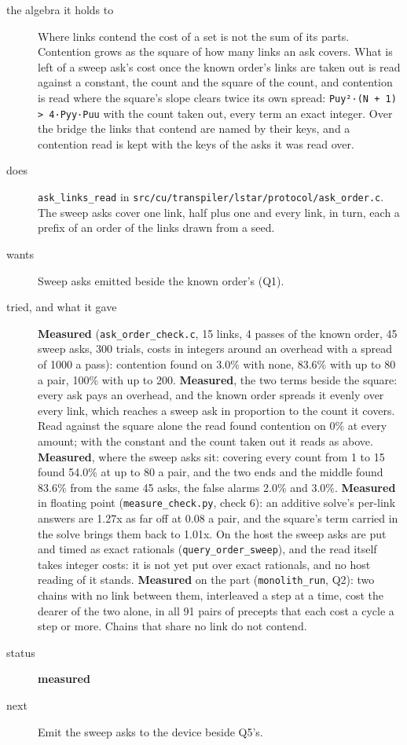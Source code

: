 \begin{description}
\item[{the algebra it holds to}] Where links contend the cost of a set is not the sum of its parts. Contention grows as the square of how many links an ask covers. What is left of a sweep ask's cost once the known order's links are taken out is read against a constant, the count and the square of the count, and contention is read where the square's slope clears twice its own spread: \texttt{Puy²·(N + 1) > 4·Pyy·Puu} with the count taken out, every term an exact integer. Over the bridge the links that contend are named by their keys, and a contention read is kept with the keys of the asks it was read over.
\item[{does}] \texttt{ask\_\allowbreak{}links\_\allowbreak{}read} in \texttt{src/\allowbreak{}cu/\allowbreak{}transpiler/\allowbreak{}lstar/\allowbreak{}protocol/\allowbreak{}ask\_\allowbreak{}order.\allowbreak{}c}. The sweep asks cover one link, half plus one and every link, in turn, each a prefix of an order of the links drawn from a seed.
\item[{wants}] Sweep asks emitted beside the known order's (Q1).
\item[{tried, and what it gave}] \textbf{Measured} (\texttt{ask\_\allowbreak{}order\_\allowbreak{}check.\allowbreak{}c}, 15 links, 4 passes of the known order, 45 sweep asks, 300 trials, costs in integers around an overhead with a spread of 1000 a pass): contention found on 3.0\% with none, 83.6\% with up to 80 a pair, 100\% with up to 200. \textbf{Measured}, the two terms beside the square: every ask pays an overhead, and the known order spreads it evenly over every link, which reaches a sweep ask in proportion to the count it covers. Read against the square alone the read found contention on 0\% at every amount; with the constant and the count taken out it reads as above. \textbf{Measured}, where the sweep asks sit: covering every count from 1 to 15 found 54.0\% at up to 80 a pair, and the two ends and the middle found 83.6\% from the same 45 asks, the false alarms 2.0\% and 3.0\%. \textbf{Measured} in floating point (\texttt{measure\_\allowbreak{}check.\allowbreak{}py}, check 6): an additive solve's per-link answers are 1.27x as far off at 0.08 a pair, and the square's term carried in the solve brings them back to 1.01x. On the host the sweep asks are put and timed as exact rationals (\texttt{query\_\allowbreak{}order\_\allowbreak{}sweep}), and the read itself takes integer costs: it is not yet put over exact rationals, and no host reading of it stands. \textbf{Measured} on the part (\texttt{monolith\_\allowbreak{}run}, Q2): two chains with no link between them, interleaved a step at a time, cost the dearer of the two alone, in all 91 pairs of precepts that each cost a cycle a step or more. Chains that share no link do not contend.
\item[{status}] \textbf{measured}
\item[{next}] Emit the sweep asks to the device beside Q5's.
\end{description}


